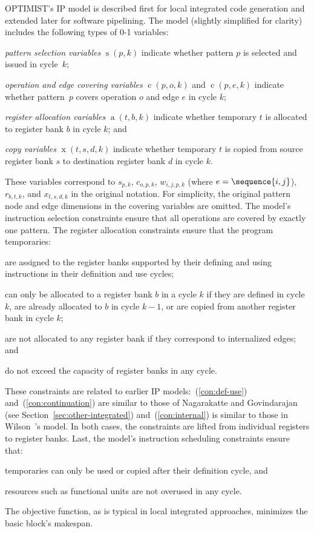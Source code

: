 \documentclass[acmsmall,authorversion,nonacm]{acmart}
\newcommand{\noMathVar}[2]{\operatorname{#1}(#2)}
\newcommand{\var}[2]{$\noMathVar{#1}{#2}$}
\begin{document}
OPTIMIST's IP model is described first for local integrated code
generation and extended later for software pipelining.
The model (slightly simplified for clarity) includes the following
types of 0-1 variables:
\begin{inparaitem}[]
\item \emph{pattern selection variables} \var{s}{p,k} indicate
  whether pattern $p$ is selected and issued in cycle~$k$;
\item \emph{operation and edge covering variables} \var{c}{p,o,k}
  and \var{c}{p,e,k} indicate whether pattern~$p$ covers operation
  $o$ and edge $e$ in cycle $k$;
\item \emph{register allocation variables} \var{a}{t,b,k} indicate
  whether temporary $t$ is allocated to register bank $b$ in cycle
  $k$; and
\item \emph{copy variables} \var{x}{t,s,d,k} indicate whether
  temporary $t$ is copied from source register bank $s$ to destination
  register bank $d$ in cycle $k$.
\end{inparaitem}
These variables correspond to $s_{p,k}$, $c_{o,p,k}$, $w_{i,j,p,k}$
(where $e = \sequence{i,j}$), $r_{b,t,k}$, and $x_{t,s,d,k}$ in the
original notation.
For simplicity, the original pattern node and edge dimensions in the
covering variables are omitted.
The model's instruction selection constraints ensure that all
operations are covered by exactly one pattern.
The register allocation constraints ensure that the program
temporaries:
\begin{inparaenum}
\item are assigned to the register banks supported by their defining
  and using instructions in their definition and use cycles;
  \label{con:def-use}
\item can only be allocated to a register bank $b$ in a cycle $k$ if
  they are defined in cycle~$k$, are already allocated to $b$ in cycle
  $k - 1$, or are copied from another register bank in cycle $k$;
  \label{con:continuation}
\item are not allocated to any register bank if they correspond to
  internalized edges; and
  \label{con:internal}
\item do not exceed the capacity of register banks in any cycle.
\end{inparaenum}
These constraints are related to earlier IP
models:~(\ref{con:def-use}) and~(\ref{con:continuation}) are similar
to those of Nagarakatte and Govindarajan (see
Section~\ref{sec:other-integrated})
and~(\ref{con:internal}) is similar to those in Wilson~\etal{}'s
model.
In both cases, the constraints are lifted from individual registers to
register banks.
Last, the model's instruction scheduling constraints ensure that:
\begin{inparaitem}[]
\item temporaries can only be used or copied after their definition
  cycle, and
\item resources such as functional units are not overused in any
  cycle.
\end{inparaitem}
The objective function, as is typical in local integrated approaches,
minimizes the basic block's makespan.
\end{document}
